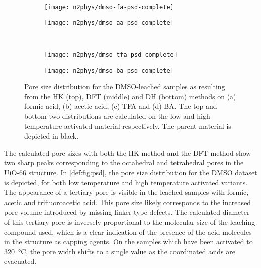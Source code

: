 \begin{figure}[p]
    \centering

    \begin{subfigure}{0.4\linewidth}
		\parbox[c]{0.12\linewidth}{\caption{}%
			\label{def:fig:psd-dmso-fa}}%
		\parbox[b]{0.88\linewidth}{%
			\texttt{[image: n2phys/dmso-fa-psd-complete]}%
		}%
    \end{subfigure}%
    \begin{subfigure}{0.4\linewidth}
		\parbox[c]{0.12\linewidth}{\caption{}%
			\label{def:fig:psd-dmso-aa}}%
		\parbox[b]{0.88\linewidth}{%
			\texttt{[image: n2phys/dmso-aa-psd-complete]}%
		}%
    \end{subfigure}%
    \\
    \begin{subfigure}{0.4\linewidth}
		\parbox[c]{0.12\linewidth}{\caption{}%
			\label{def:fig:psd-dmso-tfa}}%
		\parbox[b]{0.88\linewidth}{%
			\texttt{[image: n2phys/dmso-tfa-psd-complete]}%
		}%
    \end{subfigure}%
    \begin{subfigure}{0.4\linewidth}
		\parbox[c]{0.12\linewidth}{\caption{}%
			\label{def:fig:psd-dmso-ba}}%
		\parbox[b]{0.88\linewidth}{%
			\texttt{[image: n2phys/dmso-ba-psd-complete]}%
		}%
    \end{subfigure}%

    \caption{Pore size distribution for the \gls{DMSO}-leached
    samples as resulting from the \gls{HK} (top), \gls{DFT} (middle) and \gls{DH} 
    (bottom) methods on (a) formic acid, (b) acetic acid, (c) \gls{TFA} and 
    (d) \gls{BA}. The top and bottom two distributions are
    calculated on the low and high temperature activated material
    respectively. The parent material is depicted in black.}%
    \label{def:fig:psd}
        
\end{figure}

The calculated pore sizes with both the \gls{HK} method and the \gls{DFT} method 
show two sharp peaks corresponding to the octahedral and tetrahedral
pores in the UiO-66 structure. In \autoref{def:fig:psd}, the pore
size distribution for the \gls{DMSO} dataset is depicted, for both low
temperature and high temperature activated variants. The appearance of 
a tertiary pore is visible in the leached samples with formic,
acetic and trifluoroacetic acid. This pore size likely corresponds
to the increased pore volume introduced by missing linker-type 
defects. The calculated diameter of this tertiary pore is
inversely proportional to the molecular size of the 
leaching compound used, which is a clear indication of the presence of 
the acid molecules in the structure as capping agents. On the samples
which have been activated to \SI{320}{\degreeCelsius}, the pore width
shifts to a single value as the coordinated acids are evacuated.

